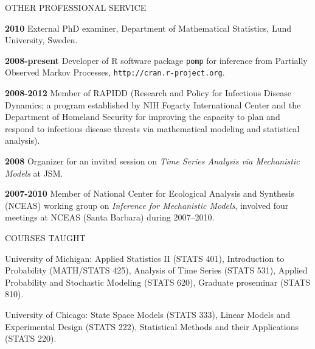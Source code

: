 \begin{mylist}{OTHER PROFESSIONAL SERVICE}
\item{\bf 2010 } External PhD examiner, 
Department of Mathematical Statistics, Lund University, Sweden.

\item{\bf 2008-present } Developer of R software package {\texttt{pomp}} for inference from Partially Observed Markov Processes, {\texttt{http://cran.r-project.org}}.

\item{\bf 2008-2012 } Member of RAPIDD (Research and Policy for Infectious Disease Dynamics; a program established by NIH Fogarty International Center and the Department of Homeland Security for improving the capacity to plan and respond to infectious disease threats via mathematical modeling and statistical analysis).

\item{\bf 2008 } Organizer for an invited session on {\it Time Series Analysis via Mechanistic Models} at JSM.

\item {\bf 2007-2010 } Member of National Center for Ecological Analysis and Synthesis (NCEAS) working group on {\it Inference for Mechanistic Models}, involved four meetings at NCEAS (Santa Barbara) during 2007--2010.
 




\end{mylist}


\lsp


\begin{mylist}{COURSES TAUGHT}

\item{University of Michigan}: 
Applied Statistics II (STATS 401), 
Introduction to Probability (MATH/STATS 425), 
Analysis of Time Series (STATS 531), 
Applied Probability and Stochastic Modeling (STATS 620), 
Graduate proseminar (STATS 810).

\item{University of Chicago}: State Space
Models (STATS 333), Linear Models and Experimental Design (STATS 222),
Statistical Methods and their Applications (STATS 220). 

\end{mylist}


